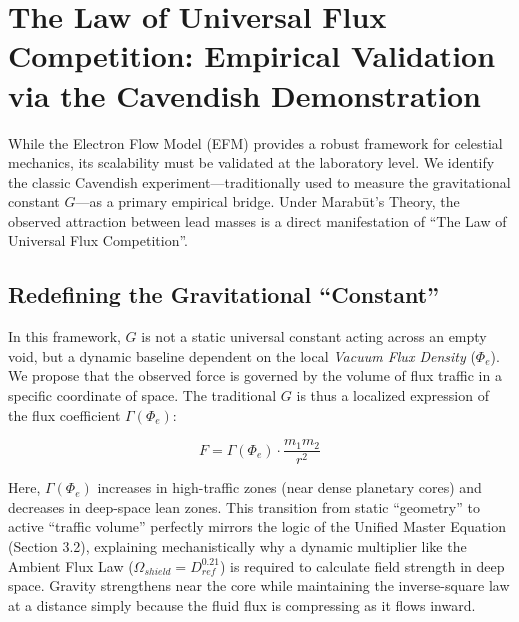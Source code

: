 \documentclass[11pt, a4paper]{article}
\begin{document}
\section{The Law of Universal Flux Competition: Empirical Validation via the Cavendish Demonstration}

While the Electron Flow Model (EFM) provides a robust framework for celestial mechanics, its scalability must be validated at the laboratory level. We identify the classic Cavendish experiment—traditionally used to measure the gravitational constant $G$—as a primary empirical bridge. Under Marab\={u}t's Theory, the observed attraction between lead masses is a direct manifestation of ``The Law of Universal Flux Competition''.

\clearpage
\subsection{Redefining the Gravitational ``Constant''}
In this framework, $G$ is not a static universal constant acting across an empty void, but a dynamic baseline dependent on the local \textit{Vacuum Flux Density} ($\Phi_e$). We propose that the observed force is governed by the volume of flux traffic in a specific coordinate of space. The traditional $G$ is thus a localized expression of the flux coefficient $\Gamma(\Phi_e)$:

\begin{equation}
  F = \Gamma(\Phi_e) \cdot \frac{m_1 m_2}{r^2}
\end{equation}

Here, $\Gamma(\Phi_e)$ increases in high-traffic zones (near dense planetary cores) and decreases in deep-space lean zones. This transition from static ``geometry'' to active ``traffic volume'' perfectly mirrors the logic of the Unified Master Equation (Section 3.2), explaining mechanistically why a dynamic multiplier like the Ambient Flux Law ($\Omega_{shield} = D_{ref}^{0.21}$) is required to calculate field strength in deep space. Gravity strengthens near the core while maintaining the inverse-square law at a distance simply because the fluid flux is compressing as it flows inward.
\end{document}
